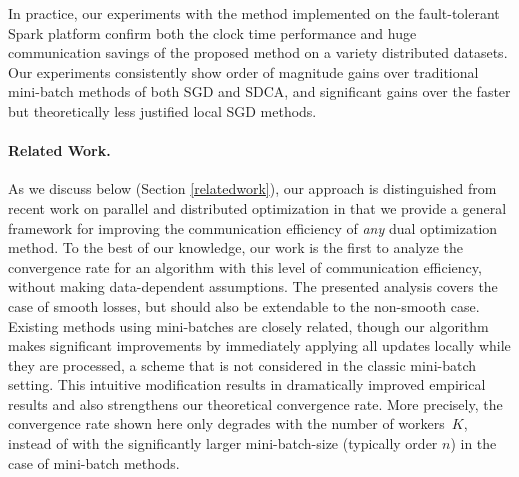 \documentclass{article} %
\begin{document}
In practice, our experiments with the method implemented on the fault-tolerant
\textsf{\small Spark} platform %
 \cite{Zaharia:2012ve} confirm both the clock
time performance and huge communication savings of the proposed method on a
variety distributed datasets.
Our experiments consistently show order of magnitude gains over traditional
mini-batch methods of both SGD and SDCA, and significant gains over the faster but theoretically
less justified local SGD methods.


\paragraph{Related Work.}
As we discuss below (Section \ref{relatedwork}), our approach
is distinguished from recent work on parallel and distributed
optimization \cite{Yang:2013vl,Yang:2013ui,Takac:2013ut,Niu:2011wo,Zinkevich:2010tj,Bradley:2011wq,Marecek:2014vu,Necoara:2013iw}
in that we provide a general framework for
improving the communication efficiency of \emph{any} dual optimization
method. 
To the best of our knowledge, our work is the first to analyze the 
convergence rate for an algorithm with this level of communication efficiency, without making data-dependent assumptions.
The presented analysis covers the case of smooth losses, but should also be 
extendable to the non-smooth case.
%
Existing methods using mini-batches \cite{Takac:2013ut,Yang:2013vl,Takac:2014vq} 
are closely related, though our algorithm makes 
significant improvements by immediately applying all updates 
locally while they are processed, a scheme that is not considered in the classic
mini-batch setting.
This intuitive modification results in dramatically improved empirical 
results and also strengthens our theoretical convergence rate.
More precisely, the convergence rate shown here only degrades with the 
number of workers~$K$, instead of with the significantly larger mini-batch-size
(typically order $n$) in the case of mini-batch methods.
\end{document}
